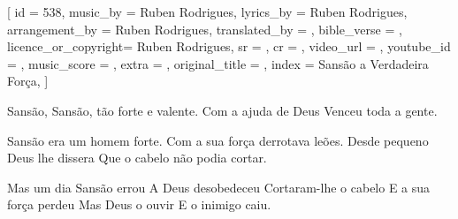 [
    id                  = {538},
    music_by            = {Ruben Rodrigues}, %
    lyrics_by           = {Ruben Rodrigues}, %
    arrangement_by      = {Ruben Rodrigues}, %
    translated_by       = {}, %
    bible_verse         = {},
    licence_or_copyright= {Ruben Rodrigues},
    sr                  = {},
    cr                  = {},
    video_url           = {}, %
    youtube_id          = {}, %
    music_score         = {}, %
    extra               = {},
    original_title      = {}, %
    index               = {Sansão a Verdadeira Força},
]

\beginchorus
Sansão, Sansão, tão forte e valente.
Com a ajuda de Deus
Venceu toda a gente.
\endchorus

\beginverse
Sansão era um homem forte.
Com a sua força derrotava leões.
Desde pequeno Deus lhe dissera 
Que o cabelo não podia cortar.
\endverse

\beginverse
Mas um dia Sansão errou
A Deus desobedeceu
Cortaram-lhe o cabelo
E a sua força perdeu
Mas Deus o ouvir
E o inimigo caiu.
\endverse

\endsong
